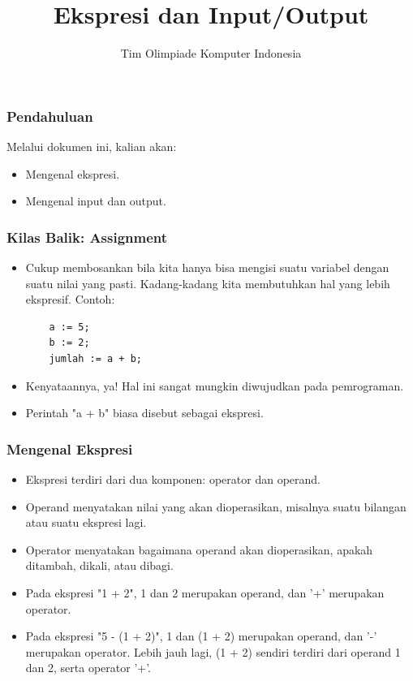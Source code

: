 \documentclass{beamer}
\title{Ekspresi dan Input/Output}
\author{Tim Olimpiade Komputer Indonesia}
\begin{document}
\begin{frame}
\titlepage
\end{frame}

\begin{frame}
\frametitle{Pendahuluan}
Melalui dokumen ini, kalian akan:
\begin{itemize}
	\item Mengenal ekspresi.
	\item Mengenal input dan output.
\end{itemize}
\end{frame}

\begin{frame}[fragile]
\frametitle{Kilas Balik: Assignment}
\begin{itemize}
	\item Cukup membosankan bila kita hanya bisa mengisi suatu variabel dengan suatu nilai yang pasti. Kadang-kadang kita membutuhkan hal yang lebih ekspresif. Contoh:
	\begin{lstlisting}
	a := 5;
	b := 2;
	jumlah := a + b;
	\end{lstlisting}
	\item Kenyataannya, ya! Hal ini sangat mungkin diwujudkan pada pemrograman.
	\item Perintah "a + b" biasa disebut sebagai ekspresi.
\end{itemize}
\end{frame}

\begin{frame}
\frametitle{Mengenal Ekspresi}
\begin{itemize}
	\item Ekspresi terdiri dari dua komponen: \alert{operator} dan \alert{operand}.
	\item Operand menyatakan nilai yang akan dioperasikan, misalnya suatu bilangan atau suatu ekspresi lagi.
	\item Operator menyatakan bagaimana operand akan dioperasikan, apakah ditambah, dikali, atau dibagi.
	\item Pada ekspresi "1 + 2", 1 dan 2 merupakan operand, dan '+' merupakan operator.
	\item Pada ekspresi "5 - (1 + 2)", 1 dan (1 + 2) merupakan operand, dan '-' merupakan operator. Lebih jauh lagi, (1 + 2) sendiri terdiri dari operand 1 dan 2, serta operator '+'.
\end{itemize}
\end{frame}
\end{document}
